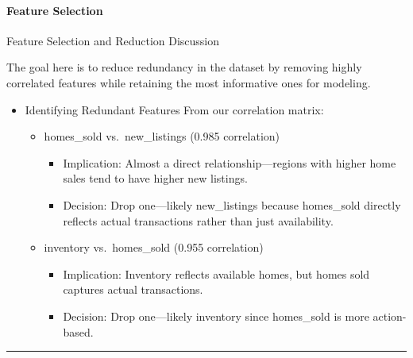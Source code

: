\documentclass[11pt]{article}
\providecommand{\tightlist}{%
      \setlength{\itemsep}{0pt}\setlength{\parskip}{0pt}}
\begin{document}
    \paragraph{Feature Selection}\label{feature-selection}

    Feature Selection and Reduction Discussion

The goal here is to reduce redundancy in the dataset by removing highly
correlated features while retaining the most informative ones for
modeling.

\begin{itemize}
\tightlist
\item
  Identifying Redundant Features From our correlation matrix:

  \begin{itemize}
  \tightlist
  \item
    homes\_sold vs.~new\_listings (0.985 correlation)

    \begin{itemize}
    \tightlist
    \item
      Implication: Almost a direct relationship---regions with higher
      home sales tend to have higher new listings.
    \item
      Decision: Drop one---likely new\_listings because homes\_sold
      directly reflects actual transactions rather than just
      availability.
    \end{itemize}
  \item
    inventory vs.~homes\_sold (0.955 correlation)

    \begin{itemize}
    \tightlist
    \item
      Implication: Inventory reflects available homes, but homes sold
      captures actual transactions.
    \item
      Decision: Drop one---likely inventory since homes\_sold is more
      action-based.
    \end{itemize}
  \end{itemize}
\end{itemize}

\begin{center}\rule{0.5\linewidth}{0.5pt}\end{center}
\end{document}
